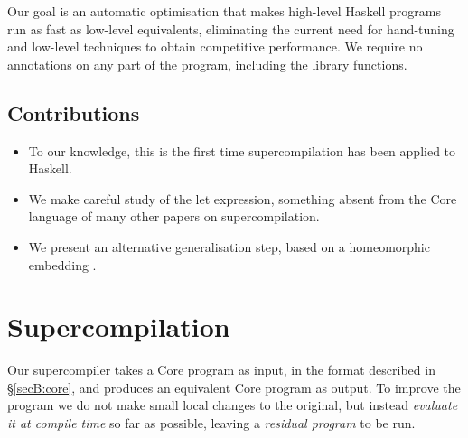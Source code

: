 Our goal is an automatic optimisation that makes high-level Haskell programs run as fast as low-level equivalents, eliminating the current need for hand-tuning and low-level techniques to obtain competitive performance. We require no annotations on any part of the program, including the library functions.

\subsection{Contributions}

\begin{itemize}
\item To our knowledge, this is the first time supercompilation has been applied to Haskell.
\item We make careful study of the let expression, something absent from the Core language of many other papers on supercompilation.
\item We present an alternative generalisation step, based on a homeomorphic embedding \cite{leuschel:homeomorphic}.
\end{itemize}


\section{Supercompilation}
\label{secS:optimisation}

Our supercompiler takes a Core program as input, in the format described in \S\ref{secB:core}, and produces an equivalent Core program as output. To improve the program we do not make small local changes to the original, but instead \textit{evaluate it at compile time} so far as possible, leaving a \textit{residual program} to be run.

